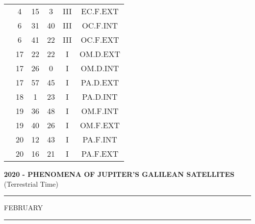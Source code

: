 \documentclass[12pt, a4paper]{article}
\begin{document}
\begin{multicols}{3}
{\begin{tabular}{c c c c c c}
	 	 	 	 & 4 & 15 & 3 & III & EC.F.EXT\\%
	 	 	 	 & 6 & 31 & 40 & III & OC.F.INT\\%
	 	 	 	 & 6 & 41 & 22 & III & OC.F.EXT\\%
	 	 	 	 & 17 & 22 & 22 & I & OM.D.EXT\\%
	 	 	 	 & 17 & 26 & 0 & I & OM.D.INT\\%
	 	 	 	 & 17 & 57 & 45 & I & PA.D.EXT\\%
	 	 	 	 & 18 & 1 & 23 & I & PA.D.INT\\%
	 	 	 	 & 19 & 36 & 48 & I & OM.F.INT\\%
	 	 	 	 & 19 & 40 & 26 & I & OM.F.EXT\\%
	 	 	 	 & 20 & 12 & 43 & I & PA.F.INT\\%
	 	 	 	 & 20 & 16 & 21 & I & PA.F.EXT\\%
	 	 \end{tabular}
 	}
\end{multicols}
\textbf{2020 - PHENOMENA OF JUPITER'S GALILEAN SATELLITES}\\(Terrestrial Time) 
\vspace{0.1cm} \hrule \vspace{0.1cm}
FEBRUARY\vspace{0.1cm}
\hrule
\vspace{-0.2cm}
\end{document}
